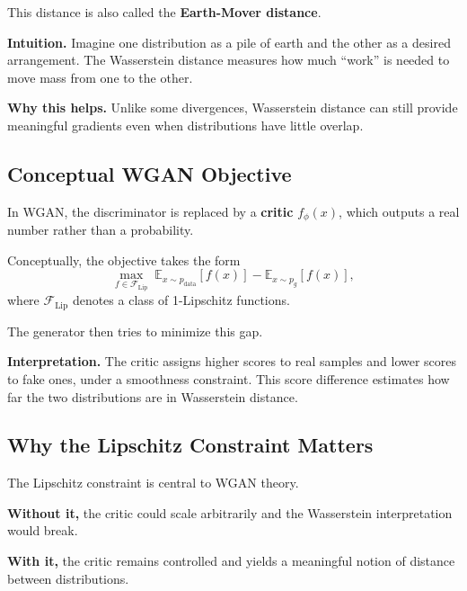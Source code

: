 \medskip

\noindent
This distance is also called the \textbf{Earth-Mover distance}.

\medskip

\noindent
\textbf{Intuition.}
Imagine one distribution as a pile of earth and the other as a desired arrangement. The Wasserstein distance measures how much ``work'' is needed to move mass from one to the other.

\medskip

\noindent
\textbf{Why this helps.}
Unlike some divergences, Wasserstein distance can still provide meaningful gradients even when distributions have little overlap.

\subsection{Conceptual WGAN Objective}

In WGAN, the discriminator is replaced by a \textbf{critic} $f_\phi(x)$, which outputs a real number rather than a probability.

\medskip

\noindent
Conceptually, the objective takes the form
\[
\max_{f \in \mathcal{F}_{\text{Lip}}}
\;
\mathbb{E}_{x\sim p_{\text{data}}}[f(x)]
-
\mathbb{E}_{x\sim p_g}[f(x)],
\]
where $\mathcal{F}_{\text{Lip}}$ denotes a class of 1-Lipschitz functions.

\medskip

\noindent
The generator then tries to minimize this gap.

\medskip

\noindent
\textbf{Interpretation.}
The critic assigns higher scores to real samples and lower scores to fake ones, under a smoothness constraint. This score difference estimates how far the two distributions are in Wasserstein distance.

\subsection{Why the Lipschitz Constraint Matters}

The Lipschitz constraint is central to WGAN theory.

\medskip

\noindent
\textbf{Without it,} the critic could scale arbitrarily and the Wasserstein interpretation would break.

\medskip

\noindent
\textbf{With it,} the critic remains controlled and yields a meaningful notion of distance between distributions.

